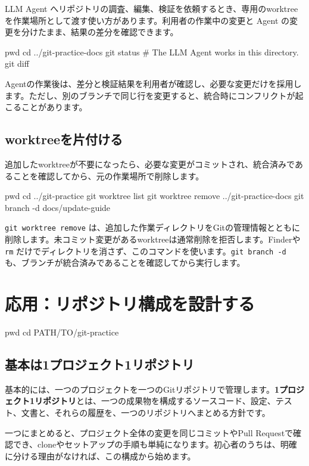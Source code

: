 \documentclass[a4paper,11pt]{jlreq}
\newcommand{\cmd}[1]{\texttt{#1}}
\newcommand{\term}[1]{\textbf{#1}}
\begin{document}
LLM Agent へリポジトリの調査、編集、検証を依頼するとき、専用のworktreeを作業場所として渡す使い方があります。利用者の作業中の変更と Agent の変更を分けたまま、結果の差分を確認できます。

\begin{codeblock}
pwd
cd ../git-practice-docs
git status
# The LLM Agent works in this directory.
git diff
\end{codeblock}

Agentの作業後は、差分と検証結果を利用者が確認し、必要な変更だけを採用します。ただし、別のブランチで同じ行を変更すると、統合時にコンフリクトが起こることがあります。

\subsection{worktreeを片付ける}

追加したworktreeが不要になったら、必要な変更がコミットされ、統合済みであることを確認してから、元の作業場所で削除します。

\begin{codeblock}
pwd
cd ../git-practice
git worktree list
git worktree remove ../git-practice-docs
git branch -d docs/update-guide
\end{codeblock}

\cmd{git worktree remove} は、追加した作業ディレクトリをGitの管理情報とともに削除します。未コミット変更があるworktreeは通常削除を拒否します。Finderや \cmd{rm} だけでディレクトリを消さず、このコマンドを使います。\cmd{git branch -d} も、ブランチが統合済みであることを確認してから実行します。

\section{応用：リポジトリ構成を設計する}

\begin{codeblock}
pwd
cd PATH/TO/git-practice
\end{codeblock}

\subsection{基本は1プロジェクト1リポジトリ}

基本的には、一つのプロジェクトを一つのGitリポジトリで管理します。\term{1プロジェクト1リポジトリ}とは、一つの成果物を構成するソースコード、設定、テスト、文書と、それらの履歴を、一つのリポジトリへまとめる方針です。

一つにまとめると、プロジェクト全体の変更を同じコミットやPull Requestで確認でき、cloneやセットアップの手順も単純になります。初心者のうちは、明確に分ける理由がなければ、この構成から始めます。
\end{document}
